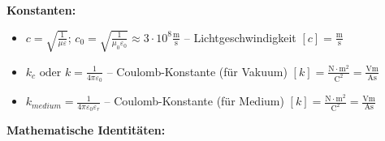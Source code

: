 \textbf{Konstanten:}
\begin{itemize}
\item $c = \sqrt{\frac{1}{\mu \varepsilon}}$; $c_0 = \sqrt{\frac{1}{\mu_0 \varepsilon_0}} \approx 3 \cdot 10^8 \frac{\text{m}}{\text{s}}$ -- Lichtgeschwindigkeit \hfill $[c] = \frac{\text{m}}{\text{s}}$
\item $k_c \text{ oder } k = \frac{1}{4\pi\varepsilon_0}$ -- Coulomb-Konstante (für Vakuum) \hfill $[k] = \frac{\text{N} \cdot \text{m}^2}{\text{C}^2} = \frac{\text{Vm}}{\text{As}}$
\item $k_{medium} = \frac{1}{4\pi\varepsilon_0\varepsilon_r}$ -- Coulomb-Konstante (für Medium) \hfill $[k] = \frac{\text{N} \cdot \text{m}^2}{\text{C}^2} = \frac{\text{Vm}}{\text{As}}$
\end{itemize}


\textbf{Mathematische Identitäten:}
